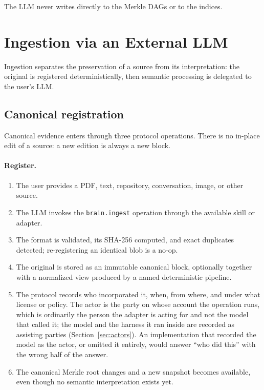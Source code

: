 \documentclass[11pt,a4paper]{article}
\begin{document}
\begin{callout}[title=Design rule]
The LLM never writes directly to the Merkle DAGs or to the indices.
\end{callout}

\section{Ingestion via an External LLM}
\label{sec:ingestion}

Ingestion separates the preservation of a source from its interpretation: the
original is registered deterministically, then semantic processing is
delegated to the user's LLM.

\subsection{Canonical registration}

Canonical evidence enters through three protocol operations. There is no
in-place edit of a source: a new edition is always a new block.

\paragraph{Register.}
\begin{enumerate}[leftmargin=1.6em]
  \item The user provides a PDF, text, repository, conversation, image, or
  other source.
  \item The LLM invokes the \texttt{brain.ingest} operation through the
  available skill or adapter.
  \item The format is validated, its SHA-256 computed, and exact duplicates
  detected; re-registering an identical blob is a no-op.
  \item The original is stored as an immutable canonical block, optionally
  together with a normalized view produced by a named deterministic pipeline.
  \item The protocol records who incorporated it, when, from where, and under
  what license or policy. The actor is the party on whose account the operation
  runs, which is ordinarily the person the adapter is acting for and not the
  model that called it; the model and the harness it ran inside are recorded as
  assisting parties (Section~\ref{sec:actors}). An implementation that recorded
  the model as the actor, or omitted it entirely, would answer ``who did this''
  with the wrong half of the answer.
  \item The canonical Merkle root changes and a new snapshot becomes
  available, even though no semantic interpretation exists yet.
\end{enumerate}
\end{document}
